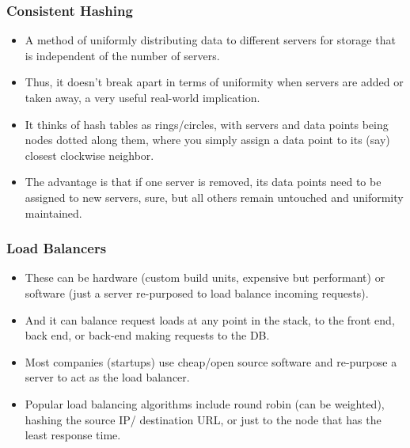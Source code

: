 \begin{frame}
	\frametitle{Consistent Hashing}
		
			\begin{itemize}
				\item A method of uniformly distributing data to different servers for 
storage that is independent of the number of servers. 
				\item Thus, it doesn’t break apart in terms of uniformity when servers are added or taken away, a very useful real-world implication. 
				\item It thinks of hash tables as rings/circles, with servers and data points being nodes dotted along them, where you simply assign a data point to its (say) closest clockwise neighbor. 
				\item The advantage is that if one server is removed, its data points need to be assigned to new servers, sure, but all others remain untouched and uniformity maintained.

			\end{itemize}		
\end{frame}

\begin{frame}
	\frametitle{Load Balancers}
		
			\begin{itemize}
				\item These can be hardware (custom build units, expensive but performant) or software (just a server 
re-purposed to load balance incoming requests). 
				\item And it can balance request loads at any point in the stack, to the front end, back end, or back-end making requests to the DB. 
				\item Most companies (startups) use cheap/open source software and re-purpose a server to act as the load balancer. 
				\item Popular load balancing algorithms include round robin (can be weighted), hashing the source IP/
destination URL, or just to the node that has the least response time.
			\end{itemize}		
\end{frame}